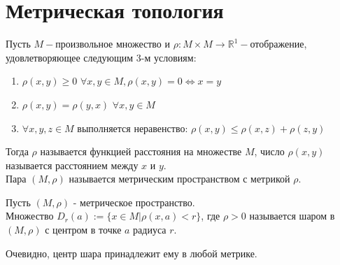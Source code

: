\section{Метрическая топология}
Пусть $M-$произвольное множество и $\rho: M{\times}M\to\mathbb{R}^1-$отображение, удовлетворяющее следующим 3-м условиям:
\begin{enumerate}
    \item $\rho(x,y){\geq}0$ $\forall x,y\in M, \rho(x,y)=0 \Leftrightarrow x=y$
    \item $\rho(x,y)=\rho(y,x)$ $\forall x,y{\in}M$
    \item $\forall x,y,z{\in}M$ выполняется неравенство: $\rho(x,y){\leq}\rho(x,z)+\rho(z,y)$
\end{enumerate}
Тогда $\rho$ называется функцией расстояния на множестве $M$, число $\rho(x,y)$ называется расстоянием между $x$ и $y$.\\
Пара $(M,\rho)$ называется метрическим пространством с метрикой $\rho$.
\begin{definition}
Пусть  $(M,\rho)$ - метрическое пространство.\\ Множество $D_r(a):=\{x\in M|\rho(x,a)<r\}$, где $\rho>0$ называется шаром в $(M,\rho)$ с центром в точке $a$ радиуса $r$.
\end{definition}
Очевидно, центр шара принадлежит ему в любой метрике. 
